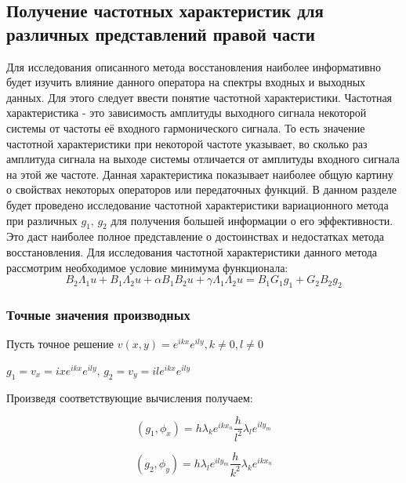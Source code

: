 \documentclass{article}
\begin{document}
\subsection{Получение частотных характеристик для различных представлений правой части}
Для исследования описанного метода восстановления наиболее информативно будет изучить влияние данного оператора на спектры входных и выходных данных. Для этого следует ввести понятие частотной характеристики. Частотная характеристика - это зависимость амплитуды выходного сигнала некоторой системы от частоты её входного гармонического сигнала. То есть значение частотной характеристики при некоторой частоте указывает, во сколько раз амплитуда сигнала на выходе системы отличается от амплитуды входного сигнала на этой же частоте. Данная характеристика показывает наиболее общую картину о свойствах некоторых операторов или передаточных функций. В данном разделе будет проведено исследование частотной характеристики вариационного метода при различных $g_1,\,g_2$ для получения большей информации о его эффективности. Это даст наиболее полное представление о достоинствах и недостатках метода восстановления. Для исследования частотной характеристики данного метода рассмотрим необходимое условие минимума функционала:
\begin{equation}\label{scheme2}
B_2 \Lambda_1 u + B_1 \Lambda_2 u + \alpha B_1 B_2 u + \gamma \Lambda_1 \Lambda_2 u = B_1 G_1 g_1 + G_2 B_2 g_2
\end{equation}
\subsubsection{Точные значения производных}
Пусть точное решение $v(x,y) = e^{ikx}e^{ily}, k \neq 0, l \neq 0$

$g_1 = v_x =ixe^{ikx}e^{ily},\, g_2 = v_y = ile^{ikx}e^{ily}$

Произведя соответствующие вычисления получаем:

$$(g_1, \phi_x) = h \lambda_k e^{ikx_n} \frac{h}{l^2} \lambda_l e^{ily_m}$$

$$(g_2, \phi_y) = h \lambda_l e^{ily_m} \frac{h}{k^2} \lambda_k e^{ikx_n}$$
\end{document}

